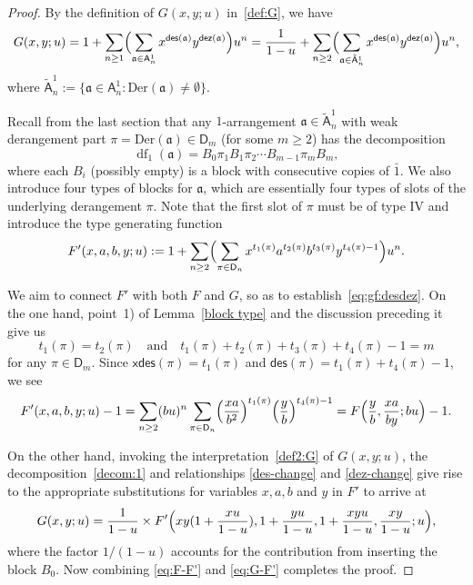 \documentclass[12pt]{amsart}
\numberwithin{equation}{section}
\theoremstyle{plain}
\theoremstyle{definition}
\newcommand\A{\mathsf{A}}
\newcommand\D{\mathsf{D}}
\def\dez{\mathsf{dez}}
\def\xdes{\mathsf{xdes}}
\def\Der{\mathrm{Der}}
\def\des{\mathsf{des}}
\def\a{\mathfrak{a}}
\def\df{\operatorname{df}}
\def\neg#1{{{{\bar#1}}}}
\begin{document}
\begin{proof}
By the definition of $G(x,y;u)$ in~\eqref{def:G}, we have 
\begin{equation}\label{def2:G}
G(x,y; u)=1+\sum_{n\geq 1} \Bigl( \sum_{\a\in\A^1_n} 
	 x^{\des(\a)} y^{\dez(\a)} \Bigr) u^n=\frac{1}{1-u}+\sum_{n\geq 2} \Bigl( \sum_{\a\in\tilde{\A}^1_n} 
	 x^{\des(\a)} y^{\dez(\a)} \Bigr) u^n,
\end{equation}
where $\tilde{\A}^1_n:=\{\a\in\A^1_n: \Der(\a)\neq\emptyset\}$. 

Recall from the last section that any $1$-arrangement $\a\in\tilde{\A}^1_n$ with weak derangement part $\pi=\Der(\a)\in\D_m$ (for some $m\geq2$) has the decomposition 
\begin{equation}\label{decom:1}
\df_1(\a)=B_0\pi_1B_1\pi_2\cdots B_{m-1}\pi_m B_m,
\end{equation}
where each $B_i$ (possibly empty) is  a block with consecutive copies of $\neg1$. We also introduce four types of blocks for $\a$, which are essentially four types of slots of the underlying derangement $\pi$. Note that the first slot of $\pi$ must be of type IV and introduce the type generating function
$$
F'(x,a,b,y; u):=1+\sum_{n\geq 2} \Bigl( \sum_{\pi\in \D_n} 
	 x^{t_1(\pi)} a^{t_2(\pi)} b^{t_3(\pi)} y^{t_4(\pi)-1} \Bigr) u^n.
$$

We aim to connect $F'$ with both $F$ and $G$, so as to establish~\eqref{eq:gf:desdez}.
On the one hand, point~1) of Lemma~\ref{block type} and the discussion preceding it give us
$$t_1(\pi)=t_2(\pi) \quad\text{and}\quad t_1(\pi)+t_2(\pi)+t_3(\pi)+t_4(\pi)-1=m$$
for any $\pi\in\D_m$. Since $\xdes(\pi)=t_1(\pi)$ and $\des(\pi)=t_1(\pi)+t_4(\pi)-1$, we see
\begin{equation}\label{eq:F-F'}
F'(x,a,b,y; u)-1 =\sum_{n\geq 2}  (bu)^n \sum_{\pi\in \D_n} 
	\Bigl(\frac{xa}{b^2}\Bigr)^{t_1(\pi)} \Bigl(\frac{y}{b}\Bigr)^{t_4(\pi)-1} 
	=F\Bigl(\frac{y}{b},\frac{xa}{by};bu\Bigr)-1.
\end{equation}

 On the other hand, invoking the interpretation~\eqref{def2:G} of $G(x,y;u)$, the decomposition~\eqref{decom:1} and relationships  \eqref{des-change} and \eqref{dez-change} give rise to the appropriate substitutions for variables $x,a,b$ and $y$ in $F'$ to arrive at
\begin{equation}\label{eq:G-F'}
G(x,y;u)=\frac{1}{1-u}\times F'\Bigl(xy(1+\frac{xu}{1-u}),1+\frac{yu}{1-u},1+\frac{xyu}{1-u},\frac{xy}{1-u}; u\Bigr),
\end{equation}
where the factor $1/(1-u)$ accounts for the contribution from inserting the block $B_0$. 
Now combining \eqref{eq:F-F'} and \eqref{eq:G-F'} completes the proof.
\end{proof}
\end{document}

